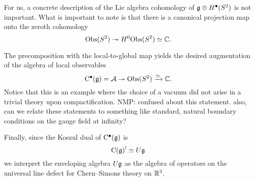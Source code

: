 \documentclass[11pt]{amsart}
\def\brian#1{{\textcolor{blue!65!red}{BRW: {#1}}}}
\def\natalie#1{{\textcolor{green!65!black}{NMP: {#1}}}}
\begin{document}
For us, a concrete description of the Lie algebra cohomology of $\mathfrak g \otimes H^\bullet(S^2)$ is not important. 
What is important to note is that there is a canonical projection map onto the zeroth cohomology 
\[
{\rm Obs} (S^2) \twoheadrightarrow H^0 {\rm Obs} (S^2) \simeq \mathbb C .
\]

The precomposition with the local-to-global map yields the desired augmentation of the algebra of local observables
\[
{\rm C}^\bullet(\mathfrak g) = \mathcal A \twoheadrightarrow {\rm Obs}(S^2) \xrightarrow{\simeq} \mathbb C  .
\]
Notice that this is an example where the choice of a vacuum did not arise in a trivial theory upon compactification.  \natalie{confused about this statement. also, can we relate these statements to something like standard, natural boundary conditions on the gauge field at infinity?}

Finally, since the Koszul dual of ${\rm C}^\bullet(\mathfrak g)$ is 
\[
{\rm C}(\mathfrak g)^! \simeq U \mathfrak g 
\]
we interpret the enveloping algebra $U \mathfrak g$ as the algebra of operators on the universal line defect for Chern--Simons theory on $\mathbb R^3$. 

%
%
%
%
%
\end{document}
